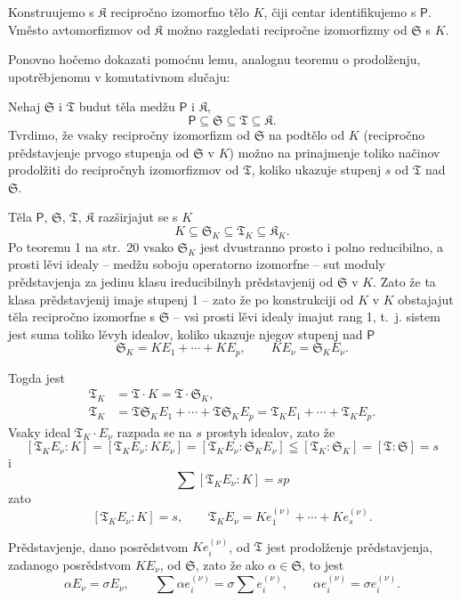 \documentclass[11pt]{article}
\begin{document}
Konstruujemo s \(\mathfrak K\) recipročno izomorfno tělo \(K\), čiji centar identifikujemo s \(\mathsf P\). Vměsto avtomorfizmov od \(\mathfrak K\) možno razgledati recipročne izomorfizmy od \(\mathfrak S\) s \(K\).

Ponovno hočemo dokazati pomoćnu lemu, analognu teoremu o prodolženju, upotrěbjenomu v komutativnom slučaju:

Nehaj \(\mathfrak S\) i \(\mathfrak T\) budut těla medžu \(\mathsf P\) i \(\mathfrak K\),
\[
\mathsf P \subseteq \mathfrak S \subseteq \mathfrak T \subseteq \mathfrak K.
\]
Tvrdimo, že vsaky recipročny izomorfizm od \(\mathfrak S\) na podtělo od \(K\) (recipročno prědstavjenje prvogo stupenja od \(\mathfrak S\) v \(K\)) možno na prinajmenje toliko načinov prodolžiti do recipročnyh izomorfizmov od \(\mathfrak T\), koliko ukazuje stupenj \(s\) od \(\mathfrak T\) nad \(\mathfrak S\).

Těla \(\mathsf P\), \(\mathfrak S\), \(\mathfrak T\), \(\mathfrak K\) razširjajut se s \(K\)
\[
K\subseteq \mathfrak S_K\subseteq \mathfrak T_K\subseteq \mathfrak K_K.
\]
Po teoremu 1 na str.~20 vsako \(\mathfrak S_K\) jest dvustranno prosto i polno reducibilno, a prosti lěvi idealy -- medžu soboju operatorno izomorfne -- sut moduly prědstavjenja za jedinu klasu ireducibilnyh prědstavjenij od \(\mathfrak S\) v \(K\). Zato že ta klasa prědstavjenij imaje stupenj 1 -- zato že po konstrukciji od \(K\) v \(K\) obstajajut těla recipročno izomorfne s \(\mathfrak S\) -- vsi prosti lěvi idealy imajut rang 1, t.~j. sistem jest suma toliko lěvyh idealov, koliko ukazuje njegov stupenj nad \(\mathsf P\)
\[
\mathfrak S_K=K E_1+\cdots+K E_p,\qquad K E_\nu=\mathfrak S_K E_\nu.
\]

Togda jest
\[
\begin{aligned}
\mathfrak T_K&=\mathfrak T\cdot K=\mathfrak T\cdot \mathfrak S_K,\\
\mathfrak T_K&=\mathfrak T\mathfrak S_K E_1+\cdots+\mathfrak T\mathfrak S_K E_p
              =\mathfrak T_K E_1+\cdots+\mathfrak T_K E_p.
\end{aligned}
\]
Vsaky ideal \(\mathfrak T_K\cdot E_\nu\) razpada se na \(s\) prostyh idealov, zato že
\[
[\mathfrak T_K E_\nu:K]=[\mathfrak T_K E_\nu:K E_\nu]=[\mathfrak T_K E_\nu:\mathfrak S_K E_\nu]\leqq[\mathfrak T_K:\mathfrak S_K]=[\mathfrak T:\mathfrak S]=s
\]
i
\[
\sum [\mathfrak T_K E_\nu:K]=sp
\]
zato
\[
[\mathfrak T_K E_\nu:K]=s,
\qquad
\mathfrak T_K E_\nu=K e_1^{(\nu)}+\cdots+K e_s^{(\nu)}.
\]

Prědstavjenje, dano posrědstvom \(K e_i^{(\nu)}\), od \(\mathfrak T\) jest prodolženje prědstavjenja, zadanogo posrědstvom \(K E_\nu\), od \(\mathfrak S\), zato že ako \(\alpha\in \mathfrak S\), to jest
\[
\alpha E_\nu=\sigma E_\nu,\qquad
\sum \alpha e_i^{(\nu)}=\sigma\sum e_i^{(\nu)},\qquad
\alpha e_i^{(\nu)}=\sigma e_i^{(\nu)}.
\]
\end{document}
